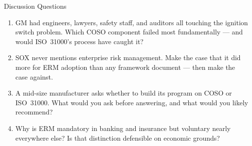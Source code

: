 \documentclass[11pt, aspectratio=169]{beamer}
\begin{document}
\begin{frame}{Discussion Questions}
\begin{enumerate}
  \item GM had engineers, lawyers, safety staff, and auditors all touching the ignition switch problem. Which COSO component failed most fundamentally --- and would ISO~31000's process have caught it?
  \item SOX never mentions enterprise risk management. Make the case that it did more for ERM adoption than any framework document --- then make the case against.
  \item A mid-size manufacturer asks whether to build its program on COSO or ISO~31000. What would you ask before answering, and what would you likely recommend?
  \item Why is ERM mandatory in banking and insurance but voluntary nearly everywhere else? Is that distinction defensible on economic grounds?
\end{enumerate}
\end{frame}
\end{document}
